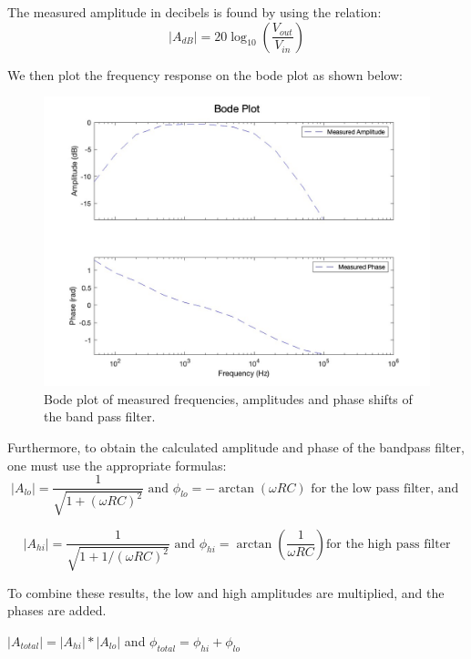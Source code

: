 The measured amplitude in decibels is found by using the relation:
\begin{equation}
    |A_{dB}| = 20\log_{10}\left(\frac{V_{out}}{V_{in}}\right)
\end{equation}


\pagebreak
We then plot the frequency response on the bode plot as shown below:

\begin{figure}[H]
    \centering
    \includegraphics[scale=0.3]{images/bode_plot_bandpass_measured.jpg}
    \caption{Bode plot of measured frequencies, amplitudes and phase shifts of the band pass filter.}
\end{figure}

Furthermore, to obtain the calculated amplitude and phase of the bandpass filter, one must use the appropriate formulas:
\[
    |A_{lo}| = \frac{1}{\sqrt{1+(\omega RC)^2}} \text{ and } \phi_{lo}=-\arctan(\omega RC) \text{ for the low pass filter, and }
\]


\[
    |A_{hi}| = \frac{1}{\sqrt{1+1/(\omega RC)^2}} \text{ and } \phi_{hi}=\arctan\left(\frac{1}{\omega RC}\right) \text{for the high pass filter}
\]


To combine these results, the low and high amplitudes are multiplied, and the phases are added.


\(|A_{total}| = |A_{hi}| * |A_{lo}|\) and \(\phi_{total} = \phi_{hi} + \phi_{lo}\)


